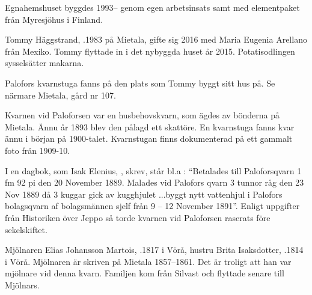 Egnahemshuset byggdes 1993-- genom egen arbetsinsats samt med elementpaket från Myresjöhus i Finland.





Tommy Häggstrand,  .1983 på Mietala, gifte sig 2016 med Maria Eugenia Arellano från Mexiko. Tommy flyttade in i det nybyggda huset år 2015. Potatisodlingen sysselsätter makarna.

Palofors kvarnstuga fanns på den plats som Tommy byggt sitt hus på. Se närmare Mietala, gård nr 107.



Kvarnen vid Paloforsen var en husbehovskvarn, som ägdes av bönderna på 	Mietala. Ännu år 1893 blev den pålagd ett skattöre. En kvarnstuga fanns kvar ännu i början på 1900-talet. Kvarnstugan finns dokumenterad på ett gammalt foto från 1909-10.

I en dagbok, som Isak Elenius, , skrev,  står bl.a : ``Betalades till Paloforsqvarn 1 fm 92 pi den 20 November 1889. Malades vid Palofors qvarn 3 tunnor råg den 23  Nov 1889 då 3 kuggar gick av kugghjulet 	...byggt nytt vattenhjul i Palofors bolagsqvarn af bolagsmännen sjelf från 9 – 12 November 1891''. Enligt uppgifter från Historiken över Jeppo så torde kvarnen vid Paloforsen raserats före sekelskiftet.


Mjölnaren Elias Johansson Martois, .1817 i Vörå, hustru Brita Isaksdotter, .1814 i Vörå. Mjölnaren är skriven på Mietala 1857–1861. Det är troligt att han var mjölnare vid denna kvarn. Familjen kom från Silvast och flyttade senare till Mjölnars.
\begin{jhchildren}
  \item {}
  \item {}
  \item {}
  \item {}
  \item {}
  \item {}
  \item {}
  \item {}
\end{jhchildren}


